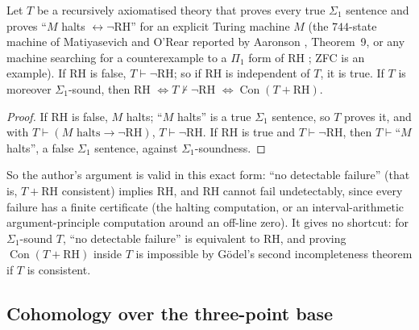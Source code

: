 \begin{proposition}\label{prop:detect}
Let $T$ be a recursively axiomatised theory that proves every true $\Sigma_1$ sentence and proves ``$M$ halts $\leftrightarrow\neg$RH'' for an explicit Turing machine $M$ (the $744$-state machine of Matiyasevich and O'Rear reported by Aaronson \cite{Aaronson}, Theorem~9, or any machine searching for a counterexample to a $\Pi_1$ form of RH \cite{DMR}; ZFC is an example). If RH is false, $T\vdash\neg$RH; so if RH is independent of $T$, it is true. If $T$ is moreover $\Sigma_1$-sound, then RH $\iff T\nvdash\neg$RH $\iff\operatorname{Con}(T+\text{RH})$.
\end{proposition}

\begin{proof}
If RH is false, $M$ halts; ``$M$ halts'' is a true $\Sigma_1$ sentence, so $T$ proves it, and with $T\vdash(M\text{ halts}\to\neg\text{RH})$, $T\vdash\neg$RH. If RH is true and $T\vdash\neg$RH, then $T\vdash$``$M$ halts'', a false $\Sigma_1$ sentence, against $\Sigma_1$-soundness.
\end{proof}

So the author's argument is valid in this exact form: ``no detectable failure'' (that is, $T+$RH consistent) implies RH, and RH cannot fail undetectably, since every failure has a finite certificate (the halting computation, or an interval-arithmetic argument-principle computation around an off-line zero). It gives no shortcut: for $\Sigma_1$-sound $T$, ``no detectable failure'' is equivalent to RH, and proving $\operatorname{Con}(T+\text{RH})$ inside $T$ is impossible by Gödel's second incompleteness theorem if $T$ is consistent.

\subsection{Cohomology over the three-point base}

